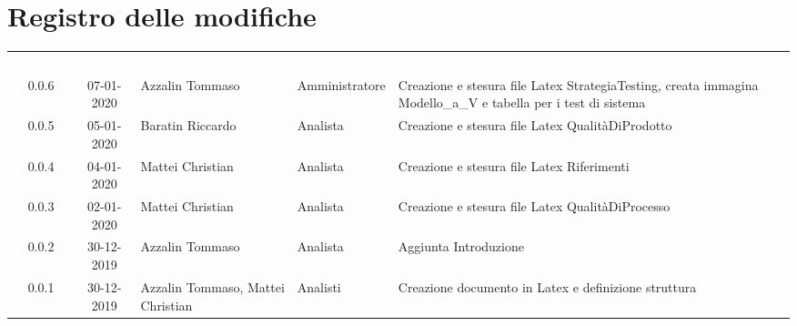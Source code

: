 \section*{Registro delle modifiche}
{
\renewcommand{\arraystretch}{1.5}
\centering
\begin{longtable}{ c c  C{4cm}  C{3cm} C{4cm}}
\textcolor{white}{\textbf{Versione}} & \textcolor{white}{\textbf{Data}} & \textcolor{white}{\textbf{Nominativo}} & \textcolor{white}{\textbf{Ruolo}} & \textcolor{white}{\textbf{Descrizione}}\\	

0.0.6 & 07-01-2020 & Azzalin Tommaso & Amministratore & Creazione e stesura file Latex StrategiaTesting, creata immagina Modello_a_V e tabella per i test di sistema \\
0.0.5 & 05-01-2020 & Baratin Riccardo & Analista & Creazione e stesura file Latex QualitàDiProdotto \\
0.0.4 & 04-01-2020 & Mattei Christian & Analista & Creazione e stesura file Latex Riferimenti \\
0.0.3 & 02-01-2020 & Mattei Christian & Analista & Creazione e stesura file Latex QualitàDiProcesso \\
0.0.2 & 30-12-2019 & Azzalin Tommaso & Analista & Aggiunta Introduzione \\
0.0.1 & 30-12-2019 & Azzalin Tommaso, Mattei Christian & Analisti & Creazione documento in Latex e definizione struttura \\	
		
\end{longtable}
}
